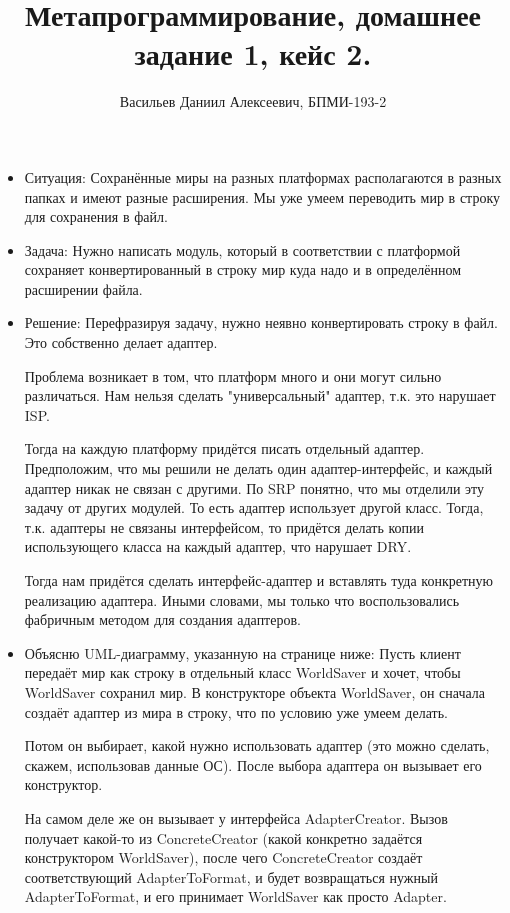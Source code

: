 \documentclass[14pt,fleqn]{article}
\title{Метапрограммирование, домашнее задание 1, кейс 2.}
\author{Васильев Даниил Алексеевич, БПМИ-193-2}
\date{}
\begin{document}
\maketitle

\large{
\begin{itemize}
\item Ситуация: Сохранённые миры на разных платформах располагаются в разных папках и имеют разные расширения. Мы уже умеем переводить мир в строку для сохранения в файл.
\item Задача: Нужно написать модуль, который в соответствии с платформой сохраняет конвертированный в строку мир куда надо и в определённом расширении файла.
\item Решение: Перефразируя задачу, нужно неявно конвертировать строку в файл. Это собственно делает адаптер.

Проблема возникает в том, что платформ много и они могут сильно различаться. Нам нельзя сделать "универсальный" адаптер, т.к. это нарушает ISP.

Тогда на каждую платформу придётся писать отдельный адаптер. Предположим, что мы решили не делать один адаптер-интерфейс, и каждый адаптер никак не связан с другими. По SRP понятно, что мы отделили эту задачу от других модулей. То есть адаптер использует другой класс. Тогда, т.к. адаптеры не связаны интерфейсом, то придётся делать копии использующего класса на каждый адаптер, что нарушает DRY.

Тогда нам придётся сделать интерфейс-адаптер и вставлять туда конкретную реализацию адаптера. Иными словами, мы только что воспользовались фабричным методом для создания адаптеров.

\item Объясню UML-диаграмму, указанную на странице ниже: Пусть клиент передаёт мир как строку в отдельный класс WorldSaver и хочет, чтобы WorldSaver сохранил мир. В конструкторе объекта WorldSaver, он сначала создаёт адаптер из мира в строку, что по условию уже умеем делать. 

Потом он выбирает, какой нужно использовать адаптер (это можно сделать, скажем, использовав данные ОС). После выбора адаптера он вызывает его конструктор.

На самом деле же он вызывает у интерфейса AdapterCreator. Вызов получает какой-то из ConcreteCreator (какой конкретно задаётся конструктором WorldSaver), после чего ConcreteCreator создаёт соответствующий AdapterToFormat, и будет возвращаться нужный AdapterToFormat, и его принимает WorldSaver как просто Adapter.


\end{itemize}}
\end{document}
